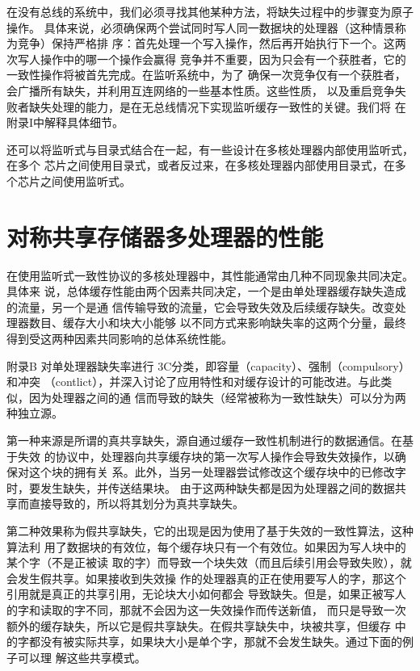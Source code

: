 在没有总线的系统中，我们必须寻找其他某种方法，将缺失过程中的步骤变为原子操作。
具体来说，必须确保两个尝试同时写人同一数据块的处理器（这种情景称为竞争）保持严格排
序：首先处理一个写入操作，然后再开始执行下一个。这两次写人操作中的哪一个操作会赢得
竞争并不重要，因为只会有一个获胜者，它的一致性操作将被首先完成。在监听系统中，为了
确保一次竞争仅有一个获胜者，会广播所有缺失，并利用互连网络的一些基本性质。这些性质，
以及重启竞争失败者缺失处理的能力，是在无总线情况下实现监听缓存一致性的关键。我们将
在附录I中解释具体细节。

还可以将监听式与目录式结合在一起，有一些设计在多核处理器内部使用监听式，在多个
芯片之间使用目录式，或者反过来，在多核处理器内部使用目录式，在多个芯片之间使用监听式。

\section{对称共享存储器多处理器的性能}
在使用监听式一致性协议的多核处理器中，其性能通常由几种不同现象共同决定。具体来
说，总体缓存性能由两个因素共同决定，一个是由单处理器缓存缺失造成的流量，另一个是通
信传输导致的流量，它会导致失效及后续缓存缺失。改变处理器数目、缓存大小和块大小能够
以不同方式来影响缺失率的这两个分量，最终得到受这两种因素共同影响的总体系统性能。

附录B 对单处理器缺失率进行 3C分类，即容量（capacity）、强制（compulsory）和冲突
（contlict），并深入讨论了应用特性和对缓存设计的可能改进。与此类似，因为处理器之间的通
信而导致的缺失（经常被称为一致性缺失）可以分为两种独立源。

第一种来源是所谓的真共享缺失，源自通过缓存一致性机制进行的数据通信。在基于失效
的协议中，处理器向共享缓存块的第一次写人操作会导致失效操作，以确保对这个块的拥有关
系。此外，当另一处理器尝试修改这个缓存块中的已修改字时，要发生缺失，并传送结果块。
由于这两种缺失都是因为处理器之间的数据共享而直接导致的，所以将其划分为真共享缺失。

第二种效果称为假共享缺失，它的出现是因为使用了基于失效的一致性算法，这种算法利
用了数据块的有效位，每个缓存块只有一个有效位。如果因为写人块中的某个字（不是正被读
取的字）而导致一个块失效（而且后续引用会导致失败），就会发生假共享。如果接收到失效操
作的处理器真的正在使用要写人的字，那这个引用就是真正的共享引用，无论块大小如何都会
导致缺失。但是，如果正被写人的字和读取的字不同，那就不会因为这一失效操作而传送新值，
而只是导致一次额外的缓存缺失，所以它是假共享缺失。在假共享缺失中，块被共享，但缓存
中的字都没有被实际共享，如果块大小是单个字，那就不会发生缺失。通过下面的例子可以理
解这些共享模式。

